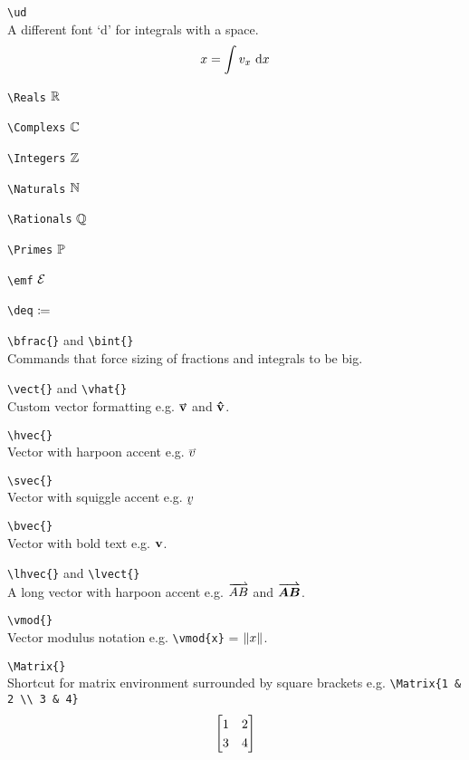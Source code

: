 \documentclass[a4paper, 12pt, english]{article}
\begin{document}
            \verb+\ud+\\
            A different font `d' for integrals with a space.
            \begin{equation*}
                x = \int v_x \ \mathrm{d} x
            \end{equation*}

            \verb+\Reals+ $\mathbb{R}$
            
            \verb+\Complexs+ $\mathbb{C}$
            
            \verb+\Integers+ $\mathbb{Z}$
            
            \verb+\Naturals+ $\mathbb{N}$
            
            \verb+\Rationals+ $\mathbb{Q}$ 

            \verb+\Primes+ $\mathbb{P}$

            \verb+\emf+ $\mathcal{E}$

            \verb+\deq+ $\coloneqq$

            \verb+\bfrac{}+ and \verb+\bint{}+\\
            Commands that force sizing of fractions and integrals to be big.
            
            \verb+\vect{}+ and \verb+\vhat{}+\\
            Custom vector formatting e.g. $\vect{v}$ and $\boldsymbol{\mathbf{\hat{v}}}$.

            \verb+\hvec{}+\\
            Vector with harpoon accent e.g. $\hvec{v}$

            \verb+\svec{}+\\
            Vector with squiggle accent e.g. $\svec{v}$

            \verb+\bvec{}+\\
            Vector with bold text e.g. $\boldsymbol{\mathbf{v}}$.

            \verb+\lhvec{}+ and \verb+\lvect{}+\\
            A long vector with harpoon accent e.g. $\lhvec{AB}$ and $\lvect{AB}$.

            \verb+\vmod{}+\\
            Vector modulus notation e.g. \verb+\vmod{x}+ = $\left\| x \right\|$.

            \verb+\Matrix{}+\\
            Shortcut for matrix environment surrounded by square brackets e.g. \verb+\Matrix{1 & 2 \\ 3 & 4}+
            \begin{equation*}
                \Matrix{1 & 2 \\ 3 & 4}
            \end{equation*}
\end{document}
